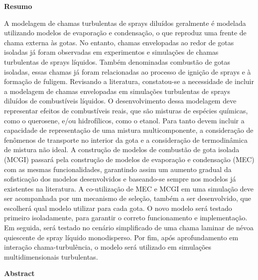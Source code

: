 
\vspace{2cm}

{ \Large \textbf{Resumo}}

\vspace{0.8cm}

{

\noindent
A modelagem de chamas turbulentas de sprays diluídos geralmente é modelada utilizando modelos de evaporação e condensação, o que reproduz uma frente de chama externa às gotas.
No entanto, chamas envelopadas ao redor de gotas isoladas já foram observadas em experimentos e simulações de chamas turbulentas de sprays líquidos.
Também denominadas combustão de gotas isoladas, essas chamas já foram relacionadas ao processo de ignição de sprays e à formação de fuligem.
Revisando a literatura, constatou-se a necessidade de incluir a modelagem de chamas envelopadas em simulações turbulentas de sprays diluídos de combustíveis líquidos.
O desenvolvimento dessa modelagem deve representar efeitos de combustíveis reais, que são misturas de espécies químicas, como o querosene, e/ou hidrofílicos, como o etanol.
Para tanto devem incluir a capacidade de representação de uma mistura multicomponente, a consideração de fenômenos de transporte no interior da gota e a consideração de termodinâmica de mistura não ideal.
A construção de modelos de combustão de gota isolada (MCGI) passará pela construção de modelos de evaporação e condensação (MEC) com as mesmas funcionalidades, garantindo assim um aumento gradual da sofisticação dos modelos desenvolvidos e baseando-se sempre nos modelos já existentes na literatura.
A co-utilização de MEC e MCGI em uma simulação deve ser acompanhada por um mecanismo de seleção, também a ser desenvolvido, que escolherá qual modelo utilizar para cada gota.
O novo modelo será testado primeiro isoladamente, para garantir o correto funcionamento e implementação. 
Em seguida, será testado no cenário simplificado de uma chama laminar de névoa quiescente de spray líquido monodisperso.
Por fim, após aprofundamento em interação chama-turbulência, o modelo será utilizado em simulações multidimensionais turbulentas.

}
\vspace{1cm}

{ \Large \textbf{Abstract}}

\vspace{0.8cm}

